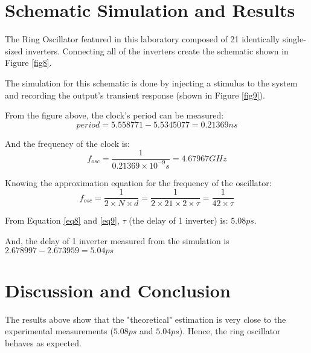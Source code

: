 \documentclass[letterpaper, 11pt]{article}
\begin{document}
\section{Schematic Simulation and Results}

The Ring Oscillator featured in this laboratory composed of 21 identically single-sized inverters. Connecting all of the inverters create the schematic shown in Figure \ref{fig8}.


The simulation for this schematic is done by injecting a stimulus to the system and recording the output's transient response (shown in Figure \ref{fig9}).


From the figure above, the clock's period can be measured:
\begin{equation}
period = 5.558771 - 5.5345077 = 0.21369ns
\end{equation}

And the frequency of the clock is:
\begin{equation}\label{eq8}
f_{osc} = \frac{1}{0.21369\times10^{-9}s} = 4.67967 GHz
\end{equation}

Knowing the approximation equation for the frequency of the oscillator:
\begin{equation}\label{eq9}
f_{osc} = \frac{1}{2\times N\times d} = \frac{1}{2\times 21 \times 2 \times \tau} = \frac{1}{42\times \tau}
\end{equation}

From Equation \ref{eq8} and \ref{eq9}, $\tau$ (the delay of 1 inverter) is: $5.08ps$.

And, the delay of 1 inverter measured from the simulation is $2.678997-2.673959 = 5.04ps$

\section{Discussion and Conclusion}

The results above show that the "theoretical" estimation is very close to the experimental measurements ($5.08ps$ and $5.04ps$). Hence, the ring oscillator behaves as expected.
\end{document}
